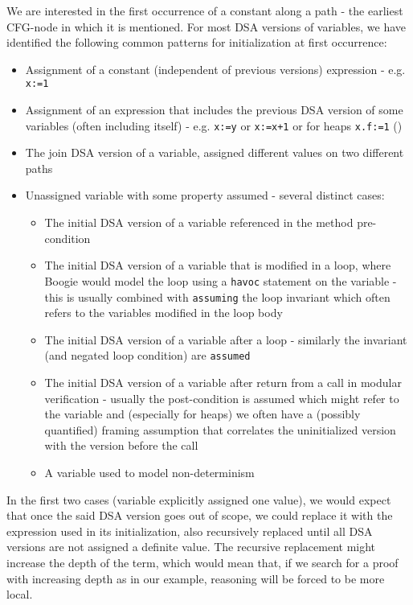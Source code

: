 We are interested in the first occurrence of a constant along a path - the earliest CFG-node in which it is mentioned.
For most DSA versions of variables, we have identified the following common patterns for initialization at first occurrence:
\begin{itemize}
	\item Assignment of a constant (independent of previous versions) expression - e.g. \lstinline|x:=1|
	\item Assignment of an expression that includes the previous DSA version of some variables (often including itself) 
	- e.g. \lstinline|x:=y| or \lstinline|x:=x+1| or for heaps \lstinline|x.f:=1| ()
	\item The join DSA version of a variable, assigned different values on two different paths
	\item Unassigned variable with some property assumed - several distinct cases:
		\begin{itemize}
			\item The initial DSA version of a variable referenced in the method pre-condition
			\item The initial DSA version of a variable that is modified in a loop, where Boogie would model the loop using a \lstinline|havoc| statement on the variable - this is usually combined with \lstinline|assuming| the loop invariant which often refers to the variables modified in the loop body
			\item The initial DSA version of a variable after a loop - similarly the invariant (and negated loop condition) are \lstinline|assumed|
			\item The initial DSA version of a variable after return from a call in modular verification - usually the post-condition is assumed which might refer to the variable and (especially for heaps) we often have a (possibly quantified) framing assumption that correlates the uninitialized version with the version before the call
			\item A variable used to model non-determinism
		\end{itemize}
\end{itemize}

In the first two cases (variable explicitly assigned one value), we would expect that once the said DSA version goes out of scope, we could replace it with the expression used in its initialization, also recursively replaced until all DSA versions are not assigned a definite value. The recursive replacement might increase the depth of the term, 
which would mean that, if we search for a proof with increasing depth as in our example, reasoning will be forced to be more local.



